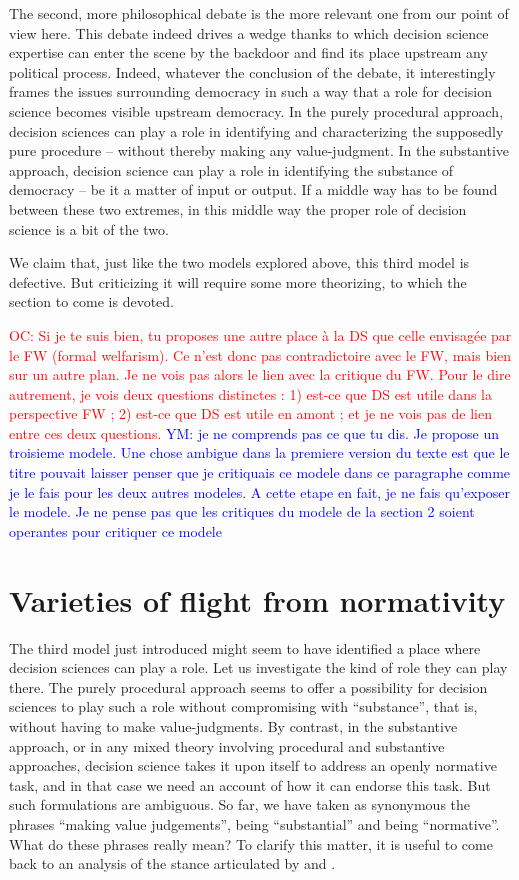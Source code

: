 \documentclass[preprint,11pt]{elsarticle}
\newcommand{\commentYM}[1]{\textcolor{blue}{YM: #1}}
\newcommand{\commentOC}[1]{\textcolor{red}{OC: #1}}
\begin{document}
The second, more philosophical debate is the more relevant one from our point of view here. This debate indeed drives a wedge thanks to which decision science expertise can enter the scene by the backdoor and find its place upstream any political process. Indeed, whatever the conclusion of the debate, it interestingly frames the issues surrounding democracy in such a way that a role for decision science becomes visible upstream democracy. In the purely procedural approach, decision sciences can play a role in identifying and characterizing the supposedly pure procedure -- without thereby making any value-judgment. In the substantive approach, decision science can play a role in identifying the substance of democracy -- be it a matter of input or output. If a middle way has to be found between these two extremes, in this middle way the proper role of decision science is a bit of the two.

We claim that, just like the two models explored above, this third model is defective. But criticizing it will require some more theorizing, to which the section to come is devoted. 

\commentOC{Si je te suis bien, tu proposes une
autre place à la DS que celle envisagée par le FW (formal
welfarism). Ce n’est donc pas contradictoire avec le FW, mais
bien sur un autre plan. Je ne vois pas alors le lien avec la
critique du FW.
Pour le dire autrement, je vois deux questions distinctes : 1)
est-ce que DS est utile dans la perspective FW ; 2) est-ce que
DS est utile en amont ; et je ne vois pas de lien entre ces
deux questions.}
\commentYM{je ne comprends pas ce que tu dis. Je propose un troisieme modele. Une chose ambigue dans la premiere version du texte est que le titre pouvait laisser penser que je critiquais ce modele dans ce paragraphe comme je le fais pour les deux autres modeles. A cette etape en fait, je ne fais qu'exposer le modele. Je ne pense pas que les critiques du modele de la section 2 soient operantes pour critiquer ce modele}

\section{Varieties of flight from normativity}
\noindent The third model just introduced might seem to have identified a place where decision sciences can play a role. Let us investigate the kind of role they can play there. The purely procedural approach seems to offer a possibility for decision sciences to play such a role without compromising with ``substance'', that is, without having to make value-judgments. By contrast, in the substantive approach, or in any mixed theory involving procedural and substantive approaches, decision science takes it upon itself to address an openly normative task, and in that case we need an account of how it can endorse this task.
But such formulations are ambiguous. So far, we have taken as synonymous the phrases ``making value judgements'', being ``substantial'' and being ``normative''. What do these phrases really mean? To clarify this matter, it is useful to come back to an analysis of the stance articulated by \cite{rawls_political_2005} and \cite{habermas_moralbewustsein_1983}.
\end{document}
